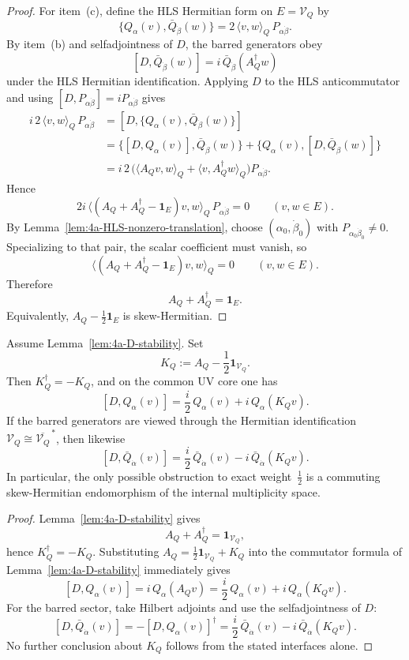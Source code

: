 \begin{proof}
For item~\textnormal{(c)}, define the HLS Hermitian form on \(E=\mathcal V_Q\) by
\[
\{Q_\alpha(v),\bar Q_{\dot\beta}(w)\}
=
2\,\langle v,w\rangle_Q\,P_{\alpha\dot\beta}.
\]
By item~\textnormal{(b)} and selfadjointness of \(D\), the barred generators obey
\[
[D,\bar Q_{\dot\beta}(w)]
=
i\,\bar Q_{\dot\beta}(A_Q^\dagger w)
\]
under the HLS Hermitian identification. Applying \(D\) to the HLS
anticommutator and using \([D,P_{\alpha\dot\beta}]=iP_{\alpha\dot\beta}\) gives
\[
\begin{aligned}
i\,2\,\langle v,w\rangle_Q\,P_{\alpha\dot\beta}
&=
[D,\{Q_\alpha(v),\bar Q_{\dot\beta}(w)\}] \\
&=
\{[D,Q_\alpha(v)],\bar Q_{\dot\beta}(w)\}
+
\{Q_\alpha(v),[D,\bar Q_{\dot\beta}(w)]\} \\
&=
i\,2\,
\bigl(
\langle A_Qv,w\rangle_Q
+
\langle v,A_Q^\dagger w\rangle_Q
\bigr)
P_{\alpha\dot\beta}.
\end{aligned}
\]
Hence
\[
2i\,\bigl\langle (A_Q+A_Q^\dagger-\mathbf 1_E)v,w\bigr\rangle_Q\,
P_{\alpha\dot\beta}
=
0
\qquad
(v,w\in E).
\]
By Lemma~\ref{lem:4a-HLS-nonzero-translation}, choose
\((\alpha_0,\dot\beta_0)\) with \(P_{\alpha_0\dot\beta_0}\neq 0\). Specializing to
that pair, the scalar coefficient must vanish, so
\[
\bigl\langle (A_Q+A_Q^\dagger-\mathbf 1_E)v,w\bigr\rangle_Q=0
\qquad
(v,w\in E).
\]
Therefore
\[
A_Q+A_Q^\dagger=\mathbf 1_E.
\]
Equivalently, \(A_Q-\tfrac12\mathbf 1_E\) is skew-Hermitian.
\end{proof}

\begin{theorem}
\label{thm:4a-Delta-half}
\label{thm:4a-D-normal-form}
Assume Lemma~\ref{lem:4a-D-stability}. Set
\[
K_Q:=A_Q-\frac12\mathbf 1_{\mathcal V_Q}.
\]
Then \(K_Q^\dagger=-K_Q\), and on the common UV core one has
\[
[D,Q_\alpha(v)]
=
\frac{i}{2}\,Q_\alpha(v)+i\,Q_\alpha(K_Qv).
\]
If the barred generators are viewed through the Hermitian identification
\(\mathcal V_Q\cong\overline{\mathcal V_Q}^{\,*}\), then likewise
\[
[D,\bar Q_{\dot\alpha}(v)]
=
\frac{i}{2}\,\bar Q_{\dot\alpha}(v)-i\,\bar Q_{\dot\alpha}(K_Qv).
\]
In particular, the only possible obstruction to exact weight~\(\tfrac12\) is a
commuting skew-Hermitian endomorphism of the internal multiplicity space.
\end{theorem}

\begin{proof}
Lemma~\ref{lem:4a-D-stability} gives
\[
A_Q+A_Q^\dagger=\mathbf 1_{\mathcal V_Q},
\]
hence \(K_Q^\dagger=-K_Q\). Substituting
\(A_Q=\frac12\mathbf 1_{\mathcal V_Q}+K_Q\) into the commutator formula of
Lemma~\ref{lem:4a-D-stability} immediately gives
\[
[D,Q_\alpha(v)]
=
i\,Q_\alpha(A_Qv)
=
\frac{i}{2}\,Q_\alpha(v)+i\,Q_\alpha(K_Qv).
\]
For the barred sector, take Hilbert adjoints and use the selfadjointness of \(D\):
\[
[D,\bar Q_{\dot\alpha}(v)]
=
-[D,Q_\alpha(v)]^\dagger
=
\frac{i}{2}\,\bar Q_{\dot\alpha}(v)-i\,\bar Q_{\dot\alpha}(K_Qv).
\]
No further conclusion about \(K_Q\) follows from the stated interfaces alone.
\end{proof}

